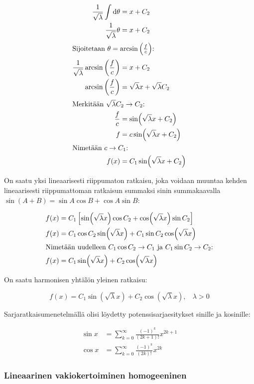 \documentclass[../johdoksia.tex]{subfiles}
\begin{document}
\begin{align*}
		\frac{1}{\sqrt{\lambda}}\int\odif{\theta} &= x + C_2 \\
		\frac{1}{\sqrt{\lambda}}\theta &= x + C_2 \\
		\intertext{Sijoitetaan $\theta = \arcsin\left(\frac{f}{c}\right)$:}
		\frac{1}{\sqrt{\lambda}}\arcsin\left(\frac{f}{c}\right) &= x + C_2 \\
		\arcsin\left(\frac{f}{c}\right) &= \sqrt{\lambda}x + \sqrt{\lambda}C_2 \\
		\intertext{Merkitään $\sqrt{\lambda}C_2 \to C_2$:}
		\frac{f}{c} &= \sin(\sqrt{\lambda}x + C_2) \\
		f &= c\sin(\sqrt{\lambda}x + C_2) \\
		\intertext{Nimetään $c \to C_1$:}
		f(x) &= C_1\sin(\sqrt{\lambda}x + C_2)
	\end{align*}
	
	On saatu yksi lineaarisesti riippumaton ratkaisu, joka voidaan muuntaa kehden lineaarisesti riippumattoman ratkaisun summaksi sinin summakaavalla $\sin(A + B) = \sin A\cos B + \cos A\sin B$:
	
	\begin{align*}
		f(x) &= C_1\left[\sin(\sqrt{\lambda}x)\cos C_2 + \cos(\sqrt{\lambda}x)\sin C_2\right] \\
		f(x) &= C_1\cos C_2\sin(\sqrt{\lambda}x) + C_1\sin C_2\cos(\sqrt{\lambda}x) \\
		\intertext{Nimetään uudelleen $C_1\cos C_2 \to C_1$ ja $C_1\sin C_2 \to C_2$:}
		f(x) &= C_1\sin(\sqrt{\lambda}x) + C_2\cos(\sqrt{\lambda}x)
	\end{align*}

	On saatu harmonisen yhtälön yleinen ratkaisu:
	
	\begin{equation}
		\boxed{f(x) = C_1\sin(\sqrt{\lambda}x) + C_2\cos(\sqrt{\lambda}x), \ \ \ \ \lambda > 0}
	\end{equation}

	Sarjaratkaisumenetelmällä olisi löydetty potenssisarjaesitykset sinille ja kosinille:
	
	\begin{equation}
		\boxed{
		\begin{aligned}
			\sin x &= \sum_{k = 0}^{\infty}\frac{(-1)^k}{(2k + 1)!}x^{2k + 1} \\
			\cos x &= \sum_{k = 0}^{\infty}\frac{(-1)^k}{(2k)!}x^{2k}
		\end{aligned}
		}
	\end{equation}
	
	\subsubsection{Lineaarinen vakiokertoiminen homogeeninen}
	
\end{document}
